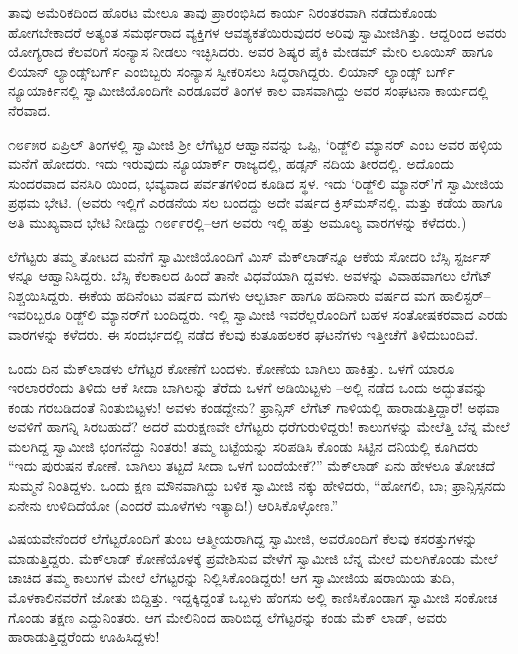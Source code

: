 ತಾವು ಅಮೆರಿಕದಿಂದ ಹೊರಟ ಮೇಲೂ ತಾವು ಪ್ರಾರಂಭಿಸಿದ ಕಾರ್ಯ ನಿರಂತರವಾಗಿ ನಡೆದುಕೊಂಡು ಹೋಗಬೇಕಾದರೆ ಅತ್ಯಂತ ಸಮರ್ಥರಾದ ವ್ಯಕ್ತಿಗಳ ಆವಶ್ಯಕತೆಯಿರುವುದರ ಅರಿವು ಸ್ವಾಮೀಜಿಗಿತ್ತು. ಆದ್ದರಿಂದ ಅವರು ಯೋಗ್ಯರಾದ ಕೆಲವರಿಗೆ ಸಂನ್ಯಾಸ ನೀಡಲು ಇಚ್ಛಿಸಿದರು. ಅವರ ಶಿಷ್ಯರ ಪೈಕಿ ಮೇಡಮ್ ಮೇರಿ ಲೂಯಿಸ್ ಹಾಗೂ ಲಿಯಾನ್ ಲ್ಯಾಂಡ್ಸ್​ಬರ್ಗ್ ಎಂಬಿಬ್ಬರು ಸಂನ್ಯಾಸ ಸ್ವೀಕರಿಸಲು ಸಿದ್ಧರಾಗಿದ್ದರು. ಲಿಯಾನ್ ಲ್ಯಾಂಡ್ಸ್ ಬರ್ಗ್ ನ್ಯೂಯಾರ್ಕಿನಲ್ಲಿ ಸ್ವಾಮೀಜಿಯೊಂದಿಗೇ ಎರಡೂವರೆ ತಿಂಗಳ ಕಾಲ ವಾಸವಾಗಿದ್ದು ಅವರ ಸಂಘಟನಾ ಕಾರ್ಯದಲ್ಲಿ ನೆರವಾದ.

೧೮೯೫ರ ಏಪ್ರಿಲ್ ತಿಂಗಳಲ್ಲಿ ಸ್ವಾಮೀಜಿ ಶ್ರೀ ಲೆಗೆಟ್ಟರ ಆಹ್ವಾನವನ್ನು ಒಪ್ಪಿ, ‘ರಿಡ್ಜ್​ಲಿ ಮ್ಯಾನರ್​ ಎಂಬ ಅವರ ಹಳ್ಳಿಯ ಮನೆಗೆ ಹೋದರು. ಇದು ಇರುವುದು ನ್ಯೂಯಾರ್ಕ್ ರಾಜ್ಯದಲ್ಲಿ, ಹಡ್ಸನ್ ನದಿಯ ತೀರದಲ್ಲಿ. ಅದೊಂದು ಸುಂದರವಾದ ವನಸಿರಿ ಯಿಂದ, ಭವ್ಯವಾದ ಪರ್ವತಗಳಿಂದ ಕೂಡಿದ ಸ್ಥಳ. ಇದು ‘ರಿಡ್ಜ್​ಲಿ ಮ್ಯಾನರ್​’ಗೆ ಸ್ವಾಮೀಜಿಯ ಪ್ರಥಮ ಭೇಟಿ. (ಅವರು ಇಲ್ಲಿಗೆ ಎರಡನೆಯ ಸಲ ಬಂದದ್ದು ಅದೇ ವರ್ಷದ ಕ್ರಿಸ್​ಮಸ್​ನಲ್ಲಿ. ಮತ್ತು ಕಡೆಯ ಹಾಗೂ ಅತಿ ಮುಖ್ಯವಾದ ಭೇಟಿ ನೀಡಿದ್ದು ೧೮೯೯ರಲ್ಲಿ–ಆಗ ಅವರು ಇಲ್ಲಿ ಹತ್ತು ಅಮೂಲ್ಯ ವಾರಗಳನ್ನು ಕಳೆದರು.)

ಲೆಗೆಟ್ಟರು ತಮ್ಮ ತೋಟದ ಮನೆಗೆ ಸ್ವಾಮೀಜಿಯೊಂದಿಗೆ ಮಿಸ್ ಮೆಕ್​ಲಾಡ್​ನ್ನೂ ಆಕೆಯ ಸೋದರಿ ಬೆಸ್ಸಿ ಸ್ಟರ್ಜಸ್​ಳನ್ನೂ ಆಹ್ವಾನಿಸಿದ್ದರು. ಬೆಸ್ಸಿ ಕೆಲಕಾಲದ ಹಿಂದೆ ತಾನೇ ವಿಧವೆಯಾಗಿ ದ್ದವಳು. ಅವಳನ್ನು ವಿವಾಹವಾಗಲು ಲೆಗೆಟ್ ನಿಶ್ಚಯಿಸಿದ್ದರು. ಈಕೆಯ ಹದಿನೆಂಟು ವರ್ಷದ ಮಗಳು ಆಲ್ಬರ್ಟಾ ಹಾಗೂ ಹದಿನಾರು ವರ್ಷದ ಮಗ ಹಾಲಿಸ್ಟರ್​–ಇವರಿಬ್ಬರೂ ರಿಡ್ಜ್​ಲಿ ಮ್ಯಾನರ್​ಗೆ ಬಂದಿದ್ದರು. ಇಲ್ಲಿ ಸ್ವಾಮೀಜಿ ಇವರೆಲ್ಲರೊಂದಿಗೆ ಬಹಳ ಸಂತೋಷಕರವಾದ ಎರಡು ವಾರಗಳನ್ನು ಕಳೆದರು. ಈ ಸಂದರ್ಭದಲ್ಲಿ ನಡೆದ ಕೆಲವು ಕುತೂಹಲಕರ ಘಟನೆಗಳು ಇತ್ತೀಚೆಗೆ ತಿಳಿದುಬಂದಿವೆ.

ಒಂದು ದಿನ ಮೆಕ್​ಲಾಡಳು ಲೆಗೆಟ್ಟರ ಕೋಣೆಗೆ ಬಂದಳು. ಕೋಣೆಯ ಬಾಗಿಲು ಹಾಕಿತ್ತು. ಒಳಗೆ ಯಾರೂ ಇರಲಾರರೆಂದು ತಿಳಿದು ಆಕೆ ಸೀದಾ ಬಾಗಿಲನ್ನು ತೆರೆದು ಒಳಗೆ ಅಡಿಯಿಟ್ಟಳು –ಅಲ್ಲಿ ನಡೆದ ಒಂದು ಅದ್ಭುತವನ್ನು ಕಂಡು ಗರಬಡಿದಂತೆ ನಿಂತುಬಿಟ್ಟಳು! ಅವಳು ಕಂಡದ್ದೇನು? ಫ್ರಾನ್ಸಿಸ್ ಲೆಗೆಟ್ ಗಾಳಿಯಲ್ಲಿ ಹಾರಾಡುತ್ತಿದ್ದಾರೆ! ಅಥವಾ ಅವಳಿಗೆ ಹಾಗನ್ನಿ ಸಿರಬಹುದೆ? ಅದರೆ ಮರುಕ್ಷಣವೇ ಲೆಗೆಟ್ಟರು ಧರೆಗುರುಳಿದ್ದರು! ಕಾಲುಗಳನ್ನು ಮೇಲೆತ್ತಿ ಬೆನ್ನ ಮೇಲೆ ಮಲಗಿದ್ದ ಸ್ವಾಮೀಜಿ ಛಂಗನೆದ್ದು ನಿಂತರು! ತಮ್ಮ ಬಟ್ಟೆಯನ್ನು ಸರಿಪಡಿಸಿ ಕೊಂಡು ಸಿಟ್ಟಿನ ದನಿಯಲ್ಲಿ ಕೂಗಿದರು “ಇದು ಪುರುಷನ ಕೋಣೆ. ಬಾಗಿಲು ತಟ್ಟದೆ ಸೀದಾ ಒಳಗೆ ಬಂದೆಯೇಕೆ?” ಮೆಕ್​ಲಾಡ್ ಏನು ಹೇಳಲೂ ತೋಚದೆ ಸುಮ್ಮನೆ ನಿಂತಿದ್ದಳು. ಒಂದು ಕ್ಷಣ ಮೌನವಾಗಿದ್ದು ಬಳಿಕ ಸ್ವಾಮೀಜಿ ನಕ್ಕು ಹೇಳಿದರು, “ಹೋಗಲಿ, ಬಾ; ಫ್ರಾನ್ಸಿಸ್ಸನದು ಏನೇನು ಉಳಿದಿದೆಯೋ (ಎಂದರೆ ಮೂಳೆಗಳು ಇತ್ಯಾದಿ!) ಆರಿಸಿಕೊಳ್ಳೋಣ.”

ವಿಷಯವೇನೆಂದರೆ ಲೆಗೆಟ್ಟರೊಂದಿಗೆ ತುಂಬ ಆತ್ಮೀಯರಾಗಿದ್ದ ಸ್ವಾಮೀಜಿ, ಅವರೊಂದಿಗೆ ಕೆಲವು ಕಸರತ್ತುಗಳನ್ನು ಮಾಡುತ್ತಿದ್ದರು. ಮೆಕ್​ಲಾಡ್ ಕೋಣೆಯೊಳಕ್ಕೆ ಪ್ರವೇಶಿಸುವ ವೇಳೆಗೆ ಸ್ವಾಮೀಜಿ ಬೆನ್ನ ಮೇಲೆ ಮಲಗಿಕೊಂಡು ಮೇಲೆ ಚಾಚಿದ ತಮ್ಮ ಕಾಲುಗಳ ಮೇಲೆ ಲೆಗಟ್ಟರನ್ನು ನಿಲ್ಲಿಸಿಕೊಂಡಿದ್ದರು! ಆಗ ಸ್ವಾಮೀಜಿಯ ಷರಾಯಿಯ ತುದಿ, ಮೊಳಕಾಲಿನವರೆಗೆ ಜೋತು ಬಿದ್ದಿತ್ತು. ಇದ್ದಕ್ಕಿದ್ದಂತೆ ಒಬ್ಬಳು ಹೆಂಗಸು ಅಲ್ಲಿ ಕಾಣಿಸಿಕೊಂಡಾಗ ಸ್ವಾಮೀಜಿ ಸಂಕೋಚ ಗೊಂಡು ತಕ್ಷಣ ಎದ್ದುನಿಂತರು. ಆಗ ಮೇಲಿನಿಂದ ಹಾರಿಬಿದ್ದ ಲೆಗೆಟ್ಟರನ್ನು ಕಂಡು ಮೆಕ್ ಲಾಡ್, ಅವರು ಹಾರಾಡುತ್ತಿದ್ದರೆಂದು ಊಹಿಸಿದ್ದಳು!

